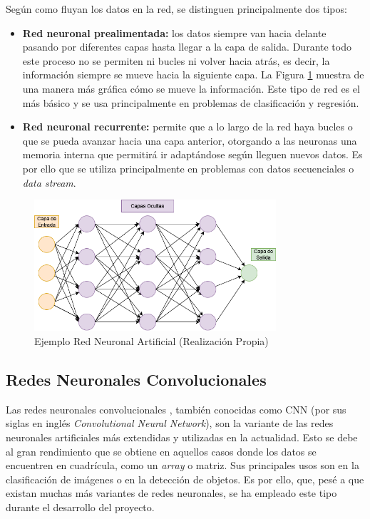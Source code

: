 Según como fluyan los datos en la red, se distinguen principalmente dos tipos:
\begin{itemize}
    \item \textbf{Red neuronal prealimentada:} los datos siempre van hacia delante pasando por diferentes capas hasta llegar a la capa de salida. Durante todo este proceso no se permiten ni bucles ni volver hacia atrás, es decir, la información siempre se mueve hacia la siguiente capa. La Figura \ref{f:redneuronal} muestra de una manera más gráfica cómo se mueve la información. Este tipo de red es el más básico y se usa principalmente en problemas de clasificación y regresión.
    \item \textbf{Red neuronal recurrente:} permite que a lo largo de la red haya bucles o que se pueda avanzar hacia una capa anterior, otorgando a las neuronas una memoria interna que permitirá ir adaptándose según lleguen nuevos datos. Es por ello que se utiliza principalmente en problemas con datos secuenciales o \emph{data stream}.
    
\end{itemize}
\begin{figure}[h]
 \centering
  \includegraphics[width=0.8\textwidth]{img/RedNeuronal.png}
 \caption{Ejemplo Red Neuronal Artificial (Realización Propia)}
 \label{f:redneuronal}
\end{figure}

\subsection{Redes Neuronales Convolucionales}
Las redes neuronales convolucionales \cite{prieto2019redes}, también conocidas como CNN (por sus siglas en inglés \emph{Convolutional Neural Network}), son la variante de las redes neuronales artificiales más extendidas y utilizadas en la actualidad. Esto se debe al gran rendimiento que se obtiene en aquellos casos donde los datos se encuentren en cuadrícula, como un \emph{array} o matriz. Sus principales usos son en la clasificación de imágenes o en la detección de objetos. Es por ello, que, pesé a que existan muchas más variantes de redes neuronales, se ha empleado este tipo durante el desarrollo del proyecto. 

